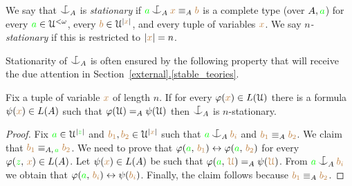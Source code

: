 \documentclass[creche.tex]{subfiles}
\begin{document}
\begin{definition}\label{def_coheir_stationary}We say that $\nonforkc_A$ is \emph{stationary\/} if ${\gr a}\nonforkc_A{\mr x}\equiv_A{\mr b}$ is a complete type (over $A,{\color{green} a}$) for every ${\color{green} a}\in\EuScript U^{<\omega}$, every ${\color{brown} b}\in\EuScript U^{|{\color{brown} x}|}$, and every tuple of variables ${\color{brown} x}$.
We say \emph{$n$-stationary\/} if this is restricted to $|{\color{brown} x}|=n$.\QED
\end{definition}

Stationarity of $\nonforkc_A$ is often ensured by the following property that will receive the due attention in Section~\hyperref[stable_teories]{\ref*{external}.\ref*{stable_teories}}.

\begin{proposition}
Fix a tuple of variable ${\color{brown} x}$ of length $n$.
If for every $\varphi({\color{brown} x})\in L(\EuScript U)$ there is a formula $\psi({\color{brown} x})\in L(A)$ such that $\varphi(\EuScript U)=_A\psi(\EuScript U)$ then $\nonforkc_A$ is $n$-stationary.
\end{proposition}

\begin{proof}
Fix ${\color{green} a}\in\EuScript U^{|{\color{green} z}|}$ and  ${\color{brown} b_1},{\color{brown} b_2}\in\EuScript U^{|{\color{brown} x}|}$ such that ${\gr a}\nonforkc_A{\mr b_i}$ and ${\color{brown} b_1}\equiv_A{\color{brown} b_2}$.
We claim that ${\color{brown} b_1}\equiv_{A,\,{\color{green} a}}{\color{brown} b_2}$.
We need to prove that $\varphi({\color{green} a},\,{\color{brown} b_1})\leftrightarrow\varphi({\color{green} a},\,{\color{brown} b_2})$ for every  $\varphi({\color{green} z},\,{\color{brown} x})\in L(A)$.
Let $\psi({\color{brown} x})\in L(A)$ be such that $\varphi({\color{green} a},\,{\color{brown} \EuScript U})=_A\psi({\color{brown} \EuScript U})$.
From ${\gr a}\nonforkc_A{\mr b_i}$ we obtain that  $\varphi({\color{green} a},\,{\color{brown} b_i})\leftrightarrow\psi({\color{brown} b_i})$.
Finally, the claim follows because ${\color{brown} b_1}\equiv_A{\color{brown} b_2}$.
\end{proof}



% 
\end{document}
